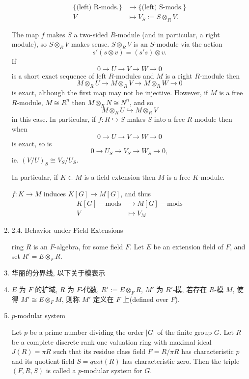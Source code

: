\documentclass{ctexart}
\begin{document}
\begin{enumerate}
\begin{align*}
\{\text{(left) R-mods.}\} &\to \{\text{(left) S-mods.}\}\\
V &\mapsto V_S := S \otimes_R V.
\end{align*}

The map $f$ makes $S$ a two-sided $R$-module (and in particular, a right module), so $S \otimes_R V$ makes sense. $S \otimes_R V$ is an $S$-module via the action
\[
s'(s \otimes v) = (s's)\otimes v.
\]
If
\[
0 \to U \to V \to W \to 0
\]
is a short exact sequence of left $R$-modules and $M$ is a right $R$-module then
\[
M\otimes_R U \to M\otimes_R V \to M\otimes_R W \to 0
\]
is exact, although the first map may not be injective. However, if $M$ is a free $R$-module, $M \cong R^n$ then $M\otimes_R N \cong N^n$, and so
\[
M\otimes_R U \hookrightarrow M\otimes_R V
\]
in this case.
\qquad In particular, if $f : R \hookrightarrow S$ makes $S$ into a free $R$-module then when
\[
0 \to U \to V \to W \to 0
\]
is exact, so is
\[
0\to U_S\to V_S\to W_S\to  0,
\]
ie. $(V/U)_S \cong V_S/U_S$.

\qquad In particular, if $K \subset M$ is a field extension then $M$ is a free $K$-module.

\qquad $f : K \to M$ induces $K[G]\to M[G]$, and thus
\begin{align*}
K[G]\!\!-\!\!\mathrm{mods} &\to M[G]\!\!-\!\!\mathrm{mods}\\
V &\mapsto V_M
\end{align*}

\item 2.4. Behavior under Field Extensions\cite{weintraub2003representation}

ring $R$ is an $F$-algebra, for some field $F$. Let $E$ be an extension field of $F$, and set $R' = E\otimes_F R$.


\item 华丽的分界线, 以下关于模表示

\item $E$ 为 $F$ 的扩域, $R$ 为 $F$-代数, $R':=E\otimes_{F} R$, $M'$ 为 $R'$-模, 若存在 $R$-模 $M$, 使得 $M' \cong E\otimes_{F} M$, 则称 $M'$ 定义在 $F$ 上(defined over $F$).

\item $p$-modular system

Let $p$ be a prime number dividing the order $\left|G\right|$ of the finite group $G$. Let $R$ be a complete discrete rank one valuation ring with maximal ideal $J(R)=\pi R$ such that its residue class field $F = R/\pi R$ has characteristic $p$ and its quotient field $S = quot(R)$ has characteristic zero. Then the triple $(F,R,S)$ is called a $p$-modular system for $G$.


\end{enumerate}
\end{document}
